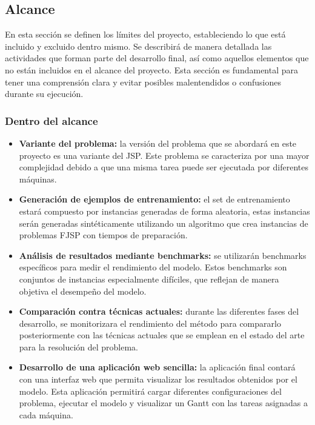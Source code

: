 \subsection{Alcance}
En esta sección se definen los límites del proyecto, estableciendo lo que está
incluido y excluido dentro mismo. Se describirá de manera detallada las
actividades que forman parte del desarrollo final, así como aquellos elementos
que no están incluidos en el alcance del proyecto. Esta sección es fundamental
para tener una comprensión clara y evitar posibles malentendidos o confusiones
durante su ejecución.

\subsubsection{Dentro del alcance}
\begin{itemize}
    \item \textbf{Variante del problema:} la versión del problema que se abordará en este proyecto
          es una variante del JSP. Este problema se caracteriza por una mayor
          complejidad debido a que una misma tarea puede ser ejecutada por diferentes máquinas.
    \item \textbf{Generación de ejemplos de entrenamiento:} el set de entrenamiento estará compuesto
          por instancias generadas de forma aleatoria, estas instancias serán generadas sintéticamente
          utilizando un algoritmo que crea instancias de problemas FJSP con tiempos de preparación.
    \item \textbf{Análisis de resultados mediante benchmarks:} se utilizarán benchmarks
          específicos para medir el rendimiento del modelo. Estos benchmarks son conjuntos de instancias
          especialmente difíciles, que reflejan de manera objetiva el desempeño del modelo.
    \item \textbf{Comparación contra técnicas actuales:} durante las diferentes fases del desarrollo,
          se monitorizara el rendimiento del método para compararlo posteriormente con las técnicas actuales
          que se emplean en el estado del arte para la resolución del problema.
    \item \textbf{Desarrollo de una aplicación web sencilla:} la aplicación final contará con una interfaz
          web que permita visualizar los resultados obtenidos por el modelo. Esta aplicación
          permitirá cargar diferentes configuraciones del problema, ejecutar el modelo y visualizar
          un Gantt con las tareas asignadas a cada máquina.
\end{itemize}

